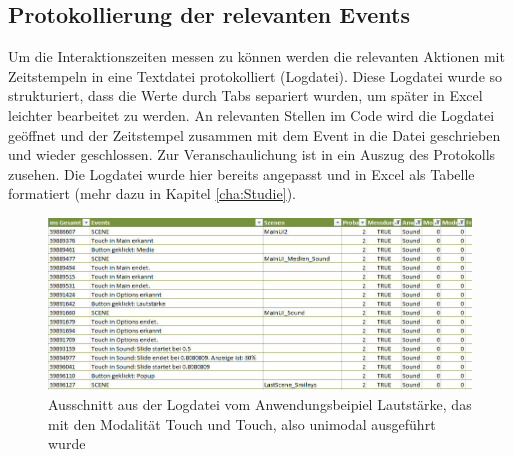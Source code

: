 \subsection[Protokollierung]{Protokollierung der relevanten Events} Um die Interaktionszeiten messen zu können werden die relevanten Aktionen mit Zeitstempeln in eine Textdatei protokolliert (Logdatei). 
Diese Logdatei wurde so strukturiert, dass die Werte durch Tabs separiert wurden, um später in Excel leichter bearbeitet zu werden. 
An relevanten Stellen im Code wird die Logdatei geöffnet und der Zeitstempel zusammen mit dem Event in die Datei geschrieben und wieder geschlossen. 
Zur Veranschaulichung ist in  ein Auszug des Protokolls zusehen. 
Die Logdatei wurde hier bereits angepasst und in Excel als Tabelle formatiert (mehr dazu in Kapitel \ref{cha:Studie}). 
\begin{figure}
	\centering
		\includegraphics[width=1\textwidth]{img/Auszug_Logging_Sound_TT.JPG}
	\caption[Ausschnitt aus der Logdatei vom Anwendungsbeipiel Lautstärke]{Ausschnitt aus der Logdatei vom Anwendungsbeipiel Lautstärke, das mit den Modalität Touch und Touch, also unimodal ausgeführt wurde}
	\label{fig:Auszug_Logging_Sound_TT}
\end{figure}

